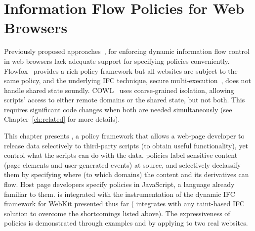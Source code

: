\chapter{Information Flow Policies for Web Browsers}
\label{ch:webpol}

Previously proposed approaches~\cite{jsflow,post14,csf15,chudnov-ccs}, 
for enforcing dynamic information flow control in web
browsers lack adequate support for specifying policies
conveniently. Flowfox~\cite{csf14} provides a rich policy framework
but all websites are subject to the same policy, and the underlying IFC
technique, secure multi-execution~\cite{SME}, does not handle shared
state soundly. COWL~\cite{cowl} uses coarse-grained isolation,
allowing scripts' access to either remote domains or the shared state,
but not both. This requires significant code changes when both are
needed simultaneously (see Chapter~\ref{ch:related} for more
details).

This chapter presents {\sys}, a policy framework that allows
a web-page developer to release data selectively to third-party scripts
(to obtain useful functionality), yet control what the scripts can do
with the data. {\sys} policies label
sensitive content (page elements and user-generated events) at source,
and selectively declassify them by specifying where (to which domains)
the content and its derivatives can flow. Host page developers specify
{\sys} policies in JavaScript, a language already familiar to them. 
{\sys} is integrated with the instrumentation of the dynamic IFC
framework for WebKit presented thus far ({\sys} integrates with any
taint-based IFC solution to overcome the shortcomings listed
above). The expressiveness of {\sys} policies is demonstrated through
examples and by applying {\sys} to two real websites. 




